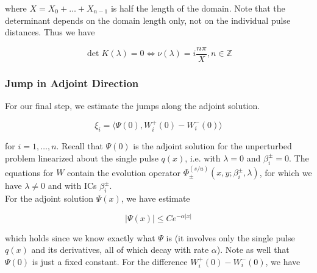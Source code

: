 \documentclass[12pt]{article}
\def\Z{{\mathbb Z}}
\begin{document}
where $X = X_0 + \dots + X_{n-1}$ is half the length of the domain. Note that the determinant depends on the domain length only, not on the individual pulse distances. Thus we have

\[
\det K(\lambda) = 0 \iff \nu(\lambda) = i \frac{n \pi}{X}, n \in \Z
\]

\subsubsection{Jump in Adjoint Direction}

For our final step, we estimate the jumps along the adjoint solution.

\begin{equation}
\xi_i = \langle \Psi(0), W_i^+(0) - W_i^-(0) \rangle 
\end{equation}

for $i = 1, \dots, n$. Recall that $\Psi(0)$ is the adjoint solution for the unperturbed problem linearized about the single pulse $q(x)$, i.e. with $\lambda = 0$ and $\beta_i^\pm = 0$. The equations for $W$ contain the evolution operator $\Phi^{(s/u)}_\pm(x, y; \beta_i^\pm, \lambda)$, for which we have $\lambda \neq 0$ and with ICs $\beta_i^\pm$.\\

For the adjoint solution $\Psi(x)$, we have estimate 

\begin{equation}
|\Psi(x)| \leq C e^{-\alpha|x|}
\end{equation}

which holds since we know exactly what $\Psi$ is (it involves only the single pulse $q(x)$ and its derivatives, all of which decay with rate $\alpha$). Note as well that $\Psi(0)$ is just a fixed constant. For the difference $W_i^+(0) - W_i^-(0)$, we have
\end{document}
